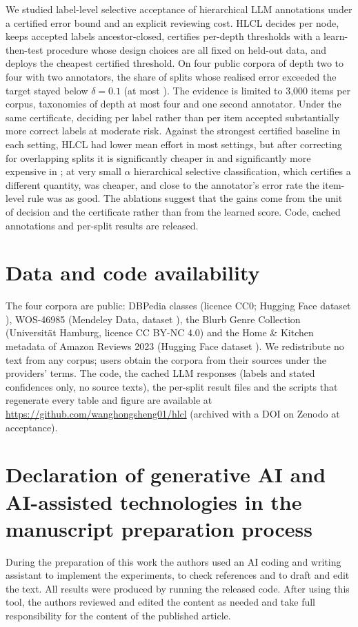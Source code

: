 \documentclass[preprint,12pt]{elsarticle}
\theoremstyle{definition}
\theoremstyle{remark}
\newcommand{\hlcl}{\textup{\textsc{HLCL}}}
\begin{document}
We studied label-level selective acceptance of hierarchical LLM annotations under
a certified error bound and an explicit reviewing cost. \hlcl{} decides per node,
keeps accepted labels ancestor-closed, certifies per-depth thresholds with a
learn-then-test procedure whose design choices are all fixed on held-out data,
and deploys the cheapest certified threshold. On four public corpora of depth
two to four with two annotators, the share of splits whose realised error
exceeded the target stayed below $\delta=0.1$ (at most
). The evidence is limited to 3,000 items per corpus,
taxonomies of depth at most four and one second annotator. Under the same certificate, deciding
per label rather than per item accepted substantially more correct labels at
moderate risk. Against the strongest certified baseline in each setting, \hlcl{}
had lower mean effort in most settings, but after correcting for overlapping
splits it is significantly cheaper in  and significantly more
expensive in ; at very small $\alpha$
hierarchical selective classification, which certifies a different quantity, was
cheaper, and close to the annotator's error rate the item-level rule was as good.
The ablations suggest that the gains come from the unit of decision and the
certificate rather than from the learned score. Code, cached
annotations and per-split results are released.

\section*{Data and code availability}
The four corpora are public: DBPedia classes (licence CC0; Hugging Face
dataset ), WOS-46985 (Mendeley Data, dataset
), the Blurb Genre Collection (Universit\"at Hamburg,
licence CC BY-NC 4.0) and the Home \& Kitchen metadata of Amazon Reviews 2023
(Hugging Face dataset ). We redistribute
no text from any corpus; users obtain the corpora from their sources under the
providers' terms. The code, the cached LLM responses (labels and stated
confidences only, no source texts), the per-split result files and the scripts
that regenerate every table and figure are available at
\url{https://github.com/wanghongsheng01/hlcl}
(archived with a DOI on Zenodo at acceptance).

\section*{Declaration of generative AI and AI-assisted technologies in the
manuscript preparation process}
During the preparation of this work the authors used an AI coding and writing
assistant to implement the experiments, to check references and to draft and
edit the text. All results were produced by running the released code. After
using this tool, the authors reviewed and edited the content as needed and take
full responsibility for the content of the published article.
\end{document}
